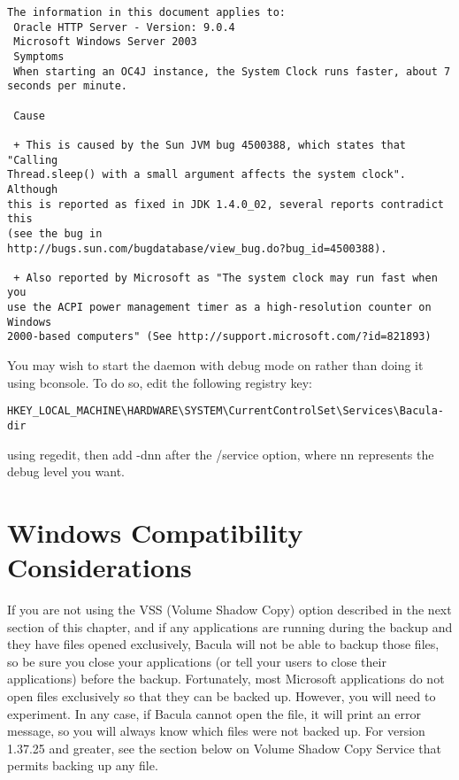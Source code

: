 \footnotesize
\begin{verbatim}
The information in this document applies to:
 Oracle HTTP Server - Version: 9.0.4
 Microsoft Windows Server 2003
 Symptoms
 When starting an OC4J instance, the System Clock runs faster, about 7
seconds per minute.
 
 Cause
 
 + This is caused by the Sun JVM bug 4500388, which states that "Calling
Thread.sleep() with a small argument affects the system clock". Although
this is reported as fixed in JDK 1.4.0_02, several reports contradict this
(see the bug in
http://bugs.sun.com/bugdatabase/view_bug.do?bug_id=4500388).
 
 + Also reported by Microsoft as "The system clock may run fast when you
use the ACPI power management timer as a high-resolution counter on Windows
2000-based computers" (See http://support.microsoft.com/?id=821893)
\end{verbatim}
\normalsize

You may wish to start the daemon with debug mode on rather than doing it
using bconsole. To do so, edit the following registry key:

\footnotesize
\begin{verbatim}
HKEY_LOCAL_MACHINE\HARDWARE\SYSTEM\CurrentControlSet\Services\Bacula-dir
\end{verbatim}
\normalsize

using regedit, then add -dnn after the /service option, where nn represents
the debug level you want.

\label{Compatibility}
\section{Windows Compatibility Considerations}

If you are not using the VSS (Volume Shadow Copy) option described in the
next section of this chapter, and if any applications are running during
the backup and they have files opened exclusively, Bacula will not be able
to backup those files, so be sure you close your applications (or tell your
users to close their applications) before the backup.  Fortunately, most
Microsoft applications do not open files exclusively so that they can be
backed up.  However, you will need to experiment.  In any case, if Bacula
cannot open the file, it will print an error message, so you will always
know which files were not backed up.  For version 1.37.25 and greater, see
the section below on Volume Shadow Copy Service that permits backing up any
file.

